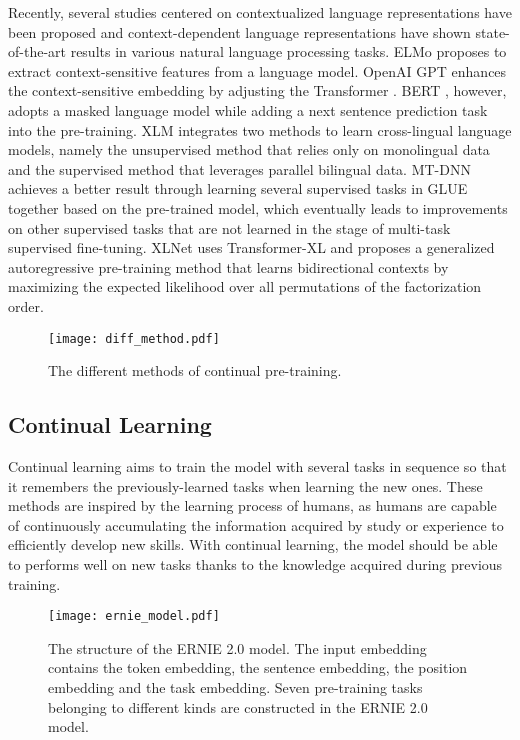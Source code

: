 \documentclass[letterpaper]{article} \usepackage{aaai20}  \usepackage{times}  \usepackage{helvet} \usepackage{courier}  \usepackage[hyphens]{url}  \usepackage{graphicx} \usepackage{makecell}
\begin{document}
Recently, several studies centered on contextualized language representations have been proposed and context-dependent language representations have shown state-of-the-art results in various natural language processing tasks.
ELMo \cite{peters2018deep} proposes to extract context-sensitive features
from a language model. 
OpenAI GPT \cite{radford2018improving} enhances the context-sensitive embedding
by adjusting the Transformer \cite{vaswani2017attention}.
BERT \cite{devlin2018bert}, however, adopts a masked language model while adding a next sentence prediction task into the pre-training.
XLM \cite{lample2019cross} integrates two methods to learn cross-lingual language models, namely the unsupervised method that relies only on monolingual data and the supervised method that leverages parallel bilingual data. 
MT-DNN \cite{liu2019multi} achieves a better result through learning several supervised tasks in GLUE\cite{wang2018glue} together based on the pre-trained model, which eventually leads to improvements on other supervised tasks that are not learned in the stage of multi-task supervised fine-tuning. 
XLNet \cite{yang2019xlnet} uses Transformer-XL \cite{dai2019transformer} and proposes a generalized autoregressive pre-training method that learns bidirectional contexts by maximizing the expected likelihood over all permutations of the factorization order.

\begin{figure} 
\centerline
{\texttt{[image: diff\_method.pdf]}}
\caption{The different methods of continual pre-training.}
\label{diff_method}
\end{figure}

\subsection{Continual Learning}
Continual learning\cite{parisi2019continual,chen2018lifelong} aims to train the model with several tasks in sequence so that it remembers the previously-learned tasks when learning the new ones. These methods are inspired by the learning process of humans, as humans are capable of continuously accumulating the information acquired by study or experience to efficiently develop new skills. With continual learning, the model should be able to performs well on new tasks thanks to the knowledge acquired during previous training.
\begin{figure*} 
\centerline
{\texttt{[image: ernie\_model.pdf]}}
\caption{The structure of the ERNIE 2.0 model. The input embedding contains the token embedding, the sentence embedding, the position embedding and the task embedding. Seven pre-training tasks belonging to different kinds are constructed in the ERNIE 2.0 model.}
\label{model_structure}
\end{figure*}
\end{document}
